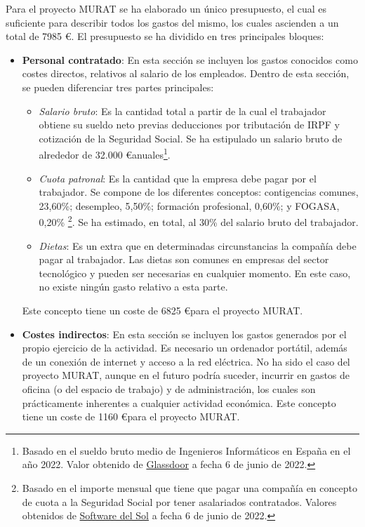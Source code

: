 Para el proyecto MURAT se ha elaborado un único presupuesto, el cual es suficiente para describir todos los gastos del mismo, los cuales ascienden a un total de 7985 \euro. El presupuesto se ha dividido en tres principales bloques:
\begin{itemize}
    \item \textbf{Personal contratado}: En esta sección se incluyen los gastos conocidos como costes directos, relativos al salario de los empleados. Dentro de esta sección, se pueden diferenciar tres partes principales:
    \begin{itemize}
        \item \textit{Salario bruto}: Es la cantidad total a partir de la cual el trabajador obtiene su sueldo neto previas deducciones por tributación de IRPF y cotización de la Seguridad Social. Se ha estipulado un salario bruto de alrededor de 32.000 \euro \space anuales\footnote{Basado en el sueldo bruto medio de Ingenieros Informáticos en España en el año 2022. Valor obtenido de \href{https://www.glassdoor.es/Sueldos/ingeniero-inform\%C3\%A1tico-sueldo-SRCH_KO0,21.htm}{Glassdoor} a fecha 6 de junio de 2022.}.
        \item \textit{Cuota patronal}: Es la cantidad que la empresa debe pagar por el trabajador. Se compone de los diferentes conceptos: contigencias comunes, 23,60\%; desempleo, 5,50\%; formación profesional, 0,60\%; y FOGASA, 0,20\% \footnote{Basado en el importe mensual que tiene que pagar una compañía en concepto de cuota a la Seguridad Social por tener asalariados contratados. Valores obtenidos de \href{https://www.sdelsol.com/glosario/cuota-patronal/}{Software del Sol} a fecha 6 de junio de 2022.}. Se ha estimado, en total, al 30\% del salario bruto del trabajador.
        \item \textit{Dietas}: Es un extra que en determinadas circunstancias la compañía debe pagar al trabajador. Las dietas son comunes en empresas del sector tecnológico y pueden ser necesarias en cualquier momento. En este caso, no existe ningún gasto relativo a esta parte.
    \end{itemize}
    Este concepto tiene un coste de 6825 \euro \space para el proyecto MURAT.
    \item \textbf{Costes indirectos}: En esta sección se incluyen los gastos generados por el propio ejercicio de la actividad. Es necesario un ordenador portátil, además de un conexión de internet y acceso a la red eléctrica. No  ha sido el caso del proyecto MURAT, aunque en el futuro podría suceder, incurrir en gastos de oficina (o del espacio de trabajo) y de administración, los cuales son prácticamente inherentes a cualquier actividad económica. Este concepto tiene un coste de 1160 \euro \space para el proyecto MURAT.

\end{itemize}
